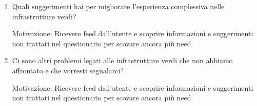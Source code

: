 \begin{enumerate}
    \item Quali suggerimenti hai per migliorare l'esperienza complessiva nelle   infrastrutture verdi?
    
    Motivazione: Ricevere feed dall'utente e scoprire informazioni e suggerimenti non trattati nel questionario per scovare ancora più need.

    \item Ci sono altri problemi legati alle infrastrutture verdi che non abbiamo affrontato e che vorresti segnalarci?
    
    Motivazione: Ricevere feed dall'utente e scoprire informazioni e suggerimenti non trattati nel questionario per scovare ancora più need.
\end{enumerate}